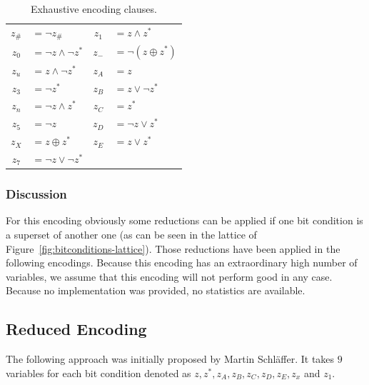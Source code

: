 \begin{table}[t]
  \begin{center}
    \begin{tabular}{cp{5cm}cl}
      $z_\#$ & $= \neg z_\#$ &
      $z_1$  & $= z \land z^*$ \\

      $z_0$  & $= \neg z \land \neg z^*$ &
      $z_-$  & $= \neg(z \oplus z^*)$ \\

      $z_u$  & $= z \land \neg z^*$ &
      $z_A$  & $= z$ \\

      $z_3$  & $= \neg z^*$ &
      $z_B$  & $= z \lor \neg z^*$ \\

      $z_n$  & $= \neg z \land z^*$ &
      $z_C$  & $= z^*$ \\

      $z_5$  & $= \neg z$ &
      $z_D$  & $= \neg z \lor z^*$ \\

      $z_X$  & $= z \oplus z^*$ &
      $z_E$  & $= z \lor z^*$ \\

      $z_7$  & $= \neg z \lor \neg z^*$ &
             & \\
    \end{tabular}
    \caption{Exhaustive encoding clauses.}
    \label{tab:exhaustive-encoding-clauses}
  \end{center}
\end{table}

\subsubsection{Discussion}
\label{sec:exhaustive-discussion}
%
For this encoding obviously some reductions can be applied if one bit condition is a superset of another one (as can be seen in the lattice of Figure~\ref{fig:bitconditions-lattice}). Those reductions have been applied in the following encodings. Because this encoding has an extraordinary high number of variables, we assume that this encoding will not perform good in any case. Because no implementation was provided, no statistics are available.

\newpage
\subsection{Reduced Encoding}
\label{sec:encoding:reduced-encoding}
%
The following approach was initially proposed by Martin Schläffer. It takes $9$ variables for each bit condition denoted as $z, z^*, z_A, z_B, z_C, z_D, z_E, z_x$ and $z_1$.

